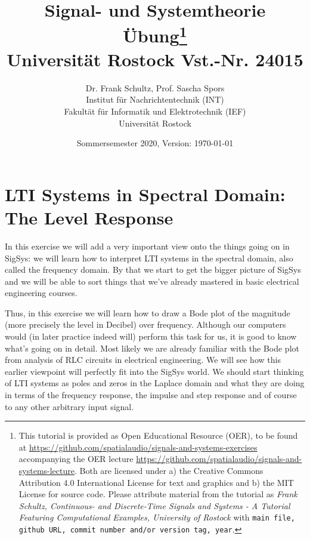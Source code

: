 \documentclass[11pt,a4paper,DIV=12]{scrartcl}
\title{Signal- und Systemtheorie\\
Übung\thanks{
This tutorial is provided as Open Educational Resource (OER), to be found at
\url{https://github.com/spatialaudio/signals-and-systems-exercises}
accompanying the OER lecture
\url{https://github.com/spatialaudio/signals-and-systems-lecture}.
%
Both are licensed under a) the Creative Commons Attribution 4.0 International
License for text and graphics and b) the MIT License for source code.
%
Please attribute material from the tutorial as \textit{Frank Schultz,
Continuous- and Discrete-Time Signals and Systems - A Tutorial Featuring
Computational Examples, University of Rostock} with
\texttt{main file, github URL, commit number and/or version tag, year}.
}
\\
\small Universität Rostock Vst.-Nr. 24015}
\author{Dr. Frank Schultz, Prof. Sascha Spors\\
\small Institut für Nachrichtentechnik (INT)\\
\small Fakultät für Informatik und Elektrotechnik (IEF)\\
\small Universität Rostock
}
\date{Sommersemester 2020, Version: \today}
\numberwithin{equation}{section}
\numberwithin{figure}{section}
\begin{document}
\maketitle
\tableofcontents
\setcounter{section}{4}

\newpage
\section{LTI Systems in Spectral Domain: The Level Response}
\noindent In this exercise we will add a very important view onto the things
going on in SigSys: we will learn how to interpret LTI systems in the spectral
domain, also called the frequency domain. By that we start to get the bigger
picture of SigSys and we will be able to sort things that we've already mastered
in basic electrical engineering courses.

Thus, in this exercise we will learn how to draw a Bode plot of the
magnitude (more precisely the level in Decibel) over frequency.
Although our computers would (in later practice indeed will)
perform this task for us, it is good to know what's going on in detail.
Most likely we are already familiar with the Bode plot from analysis of RLC
circuits in electrical engineering. We will see how this earlier viewpoint will
perfectly fit into the SigSys world. We should start thinking of LTI systems as
poles and zeros in the Laplace domain and what they are doing in terms
of the frequency response, the impulse and step response and of course to
any other arbitrary input signal.
\end{document}
